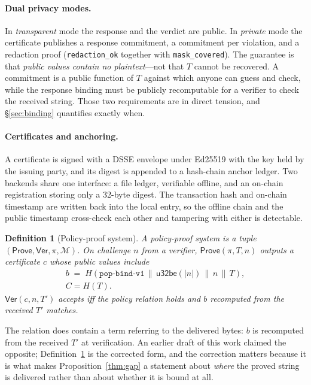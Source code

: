 \documentclass[10pt,journal,compsoc]{IEEEtran}
\newtheorem{definition}[theorem]{Definition}
\begin{document}
\paragraph{Dual privacy modes.} In \emph{transparent} mode the response and the
verdict are public. In \emph{private} mode the certificate publishes a response
commitment, a commitment per violation, and a redaction proof
(\texttt{redaction\_ok} together with \texttt{mask\_covered}). The guarantee is
that \emph{public values contain no plaintext}---not that $T$ cannot be
recovered. A commitment is a public function of $T$ against which anyone can
guess and check, while the response binding must be publicly recomputable for a
verifier to check the received string. Those two requirements are in direct
tension, and \S\ref{sec:binding} quantifies exactly when.

\paragraph{Certificates and anchoring.} A certificate is signed with a DSSE
envelope under Ed25519 with the key held by the issuing party, and its digest is
appended to a hash-chain anchor ledger. Two backends share one interface: a file
ledger, verifiable offline, and an on-chain registration storing only a 32-byte
digest. The transaction hash and on-chain timestamp are written back into the
local entry, so the offline chain and the public timestamp cross-check each
other and tampering with either is detectable.

\begin{definition}[Policy-proof system]
\label{def:system}
A policy-proof system is a tuple $(\mathsf{Prove}, \mathsf{Ver}, \pi, \mathcal{M})$.
On challenge $n$ from a verifier, $\mathsf{Prove}(\pi, T, n)$ outputs a
certificate $c$ whose public values include
\begin{multline*}
b \;=\; H(\texttt{pop-bind-v1} \,\|\, \mathsf{u32be}(|n|) \,\|\, n \,\|\, T),\\
C = H(T).
\end{multline*}
$\mathsf{Ver}(c, n, T')$ accepts iff the policy relation holds \emph{and}
$b$ recomputed from the received $T'$ matches.
\end{definition}

The relation does contain a term referring to the delivered bytes: $b$ is
recomputed from the received $T'$ at verification. An earlier draft of this
work claimed the opposite; Definition~\ref{def:system} is the corrected form,
and the correction matters because it is what makes
Proposition~\ref{thm:gap} a statement about \emph{where} the proved string is
delivered rather than about whether it is bound at all.
\end{document}
